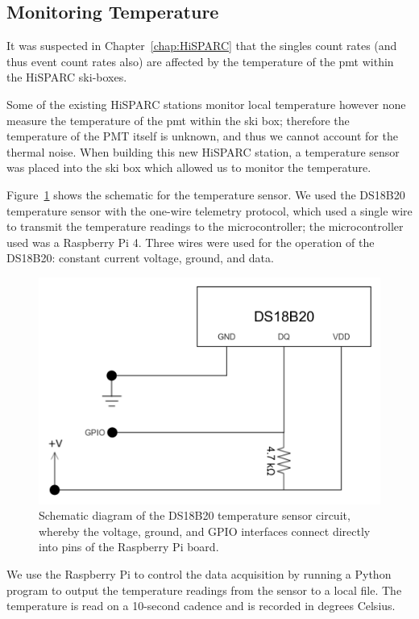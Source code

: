 \subsection{Monitoring Temperature}

It was suspected in Chapter~\ref{chap:HiSPARC} that the singles count rates (and thus event count rates also) are affected by the temperature of the \gls{pmt} within the HiSPARC ski-boxes.

Some of the existing HiSPARC stations monitor local temperature however none measure the temperature of the \gls{pmt} within the ski box; therefore the temperature of the PMT itself is unknown, and thus we cannot account for the thermal noise. When building this new HiSPARC station, a temperature sensor was placed into the ski box which allowed us to monitor the temperature.

Figure~\ref{fig:temperature_sensor_circuit} shows the schematic for the temperature sensor. We used the DS18B20 temperature sensor with the one-wire telemetry protocol, which used a single wire to transmit the temperature readings to the microcontroller; the microcontroller used was a Raspberry Pi 4. Three wires were used for the operation of the DS18B20: constant current voltage, ground, and data.

\begin{figure}
	\centering
	\includegraphics[width=0.6\columnwidth]{HS_14008_temp_circuit.png}
	\caption{Schematic diagram of the DS18B20 temperature sensor circuit, whereby the voltage, ground, and GPIO interfaces connect directly into pins of the Raspberry Pi board.}
	\label{fig:temperature_sensor_circuit}
\end{figure}

We use the Raspberry Pi to control the data acquisition by running a Python program to output the temperature readings from the sensor to a local file. The temperature is read on a 10-second cadence and is recorded in degrees Celsius.

